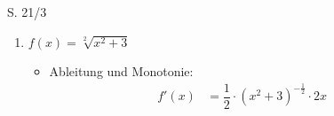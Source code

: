 \begin{Exercise}{S. 21/3}{}
\begin{enumerate}
\begin{enumerate}[label=\alph*)]
{\begin{itemize}[leftmargin=*]
{                        \vspace{-2.0ex}
                        \begin{align*}
                            f'(x) &= 2 \cdot \left(x-2\right)^{1} \cdot 1&&\\[1.5ex]
                            &= 2 \cdot \left(x-2\right) &&
                        \end{align*}\\[-2.0ex]
                        \begin{align*}
                            f'(x) &= 0 \\[2.0ex]
                            2 \cdot \left(x-2\right) &= 0 &&| \quad :2\\[1.5ex]
                            x-2 &= 0 &&| \quad +2\\[1.5ex]
                            x_{1} &= 2 \text{\textit{(e)}} &&
                        \end{align*}\\[-2.0ex]
                        \begin{tabularx}{0.95\linewidth}{c|X|X|X}
                            & $-\infty < x < 2$ & $x = 2$ & $2 < x < \infty$ \\ \hline
                            $f'(x)$ & $-$ & $0$ & $+$ \\ \hline
                            $G_{f}$ & $\searrow$ & TiP & $\nearrow$ \\              
                        \end{tabularx}\\[4.0ex]
                        $\Rightarrow \quad G_{f}$ ist umkehrbar in $\left] \ -\infty; 2 \ \right]$ sowie $\left[ \ 2; \infty \ \right[$\\[-1.0ex]
                        }
                \end{itemize}
                }
            \item[c)] {
                $f(x) = \sqrt[2]{x^2 +3}$\\[-2.0ex]
                \begin{itemize}[leftmargin=*]
                    \item Ableitung und Monotonie: \\{
                        \vspace{-2.0ex}
                        \begin{align*}
                            f'(x) &= \dfrac{1}{2} \cdot \left(x^{2} +3\right)^{-\frac{1}{2}} \cdot 2x &&\\[1.5ex]

\end{align*}}
\end{itemize}}
\end{enumerate}
\end{enumerate}
\end{Exercise}
